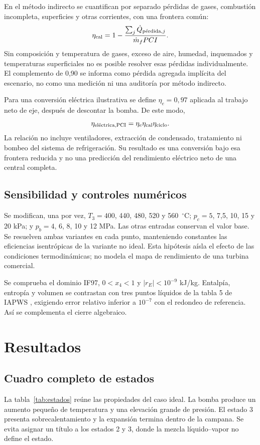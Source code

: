 \documentclass[conference,a4paper,11pt]{IEEEtran}
\begin{document}
En el método indirecto se cuantifican por separado pérdidas de gases, combustión incompleta, superficies y otras corrientes, con una frontera común:
\begin{equation}
\eta_{\rm cal}=1-
\frac{\sum_j\dot Q_{\text{pérdida},j}}{\dot m_f PCI}.
\label{eq:indirecto}
\end{equation}
Sin composición y temperatura de gases, exceso de aire, humedad, inquemados y temperaturas superficiales no es posible resolver esas pérdidas individualmente. El complemento de 0,90 se informa como pérdida agregada implícita del escenario, no como una medición ni una auditoría por método indirecto.

Para una conversión eléctrica ilustrativa se define $\eta_e=0,97$ aplicada al trabajo neto de eje, después de descontar la bomba. De este modo,
\begin{equation}
\eta_{\text{eléctrica,PCI}}=\eta_e\eta_{\rm cal}\eta_{\rm ciclo}.
\label{eq:electrica}
\end{equation}
La relación no incluye ventiladores, extracción de condensado, tratamiento ni bombeo del sistema de refrigeración. Su resultado es una conversión bajo esa frontera reducida y no una predicción del rendimiento eléctrico neto de una central completa.

\subsection{Sensibilidad y controles numéricos}
Se modifican, una por vez, $T_3=400$, 440, 480, 520 y 560~$^\circ$C; $p_c=5$, 7,5, 10, 15 y 20 kPa; y $p_b=4$, 6, 8, 10 y 12 MPa. Las otras entradas conservan el valor base. Se resuelven ambas variantes en cada punto, manteniendo constantes las eficiencias isentrópicas de la variante no ideal. Esta hipótesis aísla el efecto de las condiciones termodinámicas; no modela el mapa de rendimiento de una turbina comercial.

Se comprueba el dominio IF97, $0<x_4<1$ y $|r_E|<10^{-9}$ kJ/kg. Entalpía, entropía y volumen se contrastan con tres puntos líquidos de la tabla 5 de IAPWS \cite{iapws}, exigiendo error relativo inferior a $10^{-7}$ con el redondeo de referencia. Así se complementa el cierre algebraico.

\section{Resultados}
\subsection{Cuadro completo de estados}
La tabla~\ref{tab:estados} reúne las propiedades del caso ideal. La bomba produce un aumento pequeño de temperatura y una elevación grande de presión. El estado 3 presenta sobrecalentamiento y la expansión termina dentro de la campana. Se evita asignar un título a los estados 2 y 3, donde la mezcla líquido--vapor no define el estado.
\end{document}

